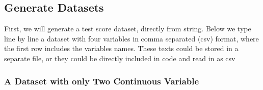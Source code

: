 \documentclass[
]{article}
\begin{document}
\hypertarget{generate-datasets}{%
\subsection{Generate Datasets}\label{generate-datasets}}

First, we will generate a test score dataset, directly from string.
Below we type line by line a dataset with four variables in comma
separated (csv) format, where the first row includes the variables
names. These texts could be stored in a separate file, or they could be
directly included in code and read in as csv

\hypertarget{a-dataset-with-only-two-continuous-variable}{%
\subsubsection{A Dataset with only Two Continuous
Variable}\label{a-dataset-with-only-two-continuous-variable}}
\end{document}
